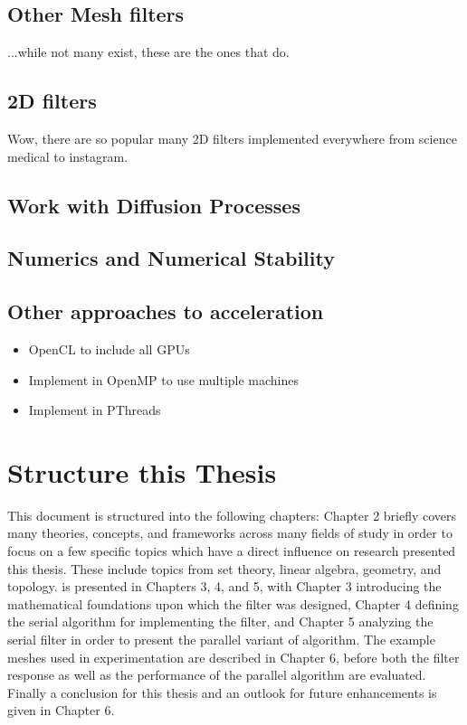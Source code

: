 %
%
%
%
\subsection{Other Mesh filters}
...while not many exist, these are the ones that do.

%
%
%
%
\subsection{2D filters}
Wow, there are so popular many 2D filters implemented everywhere from science medical to instagram.

%
%
%
%
\subsection{Work with Diffusion Processes}

%
%
%
%
\subsection{Numerics and Numerical Stability}

%
%
%
%
\subsection{Other approaches to acceleration}
\begin{itemize}
	\item OpenCL to include all GPUs
	\item Implement in OpenMP to use multiple machines
	\item Implement in PThreads
\end{itemize}

%
%
%
%
%


%
\section{Structure this Thesis}
This document is structured into the following chapters: Chapter 2 briefly covers many theories, concepts, and frameworks across many fields of study in order to focus on a few specific topics which have a direct influence on research presented this thesis. These include topics from set theory, linear algebra, geometry, and topology.  is presented in Chapters 3, 4, and 5, with Chapter 3 introducing the mathematical foundations upon which the filter was designed, Chapter 4 defining the serial algorithm for implementing the filter, and Chapter 5 analyzing the serial filter in order to present the parallel variant of  algorithm. The example meshes used in experimentation are described in Chapter 6, before both the filter response as well as the performance of the parallel algorithm are evaluated. Finally a conclusion for this thesis and an outlook for future enhancements is given in Chapter 6.
